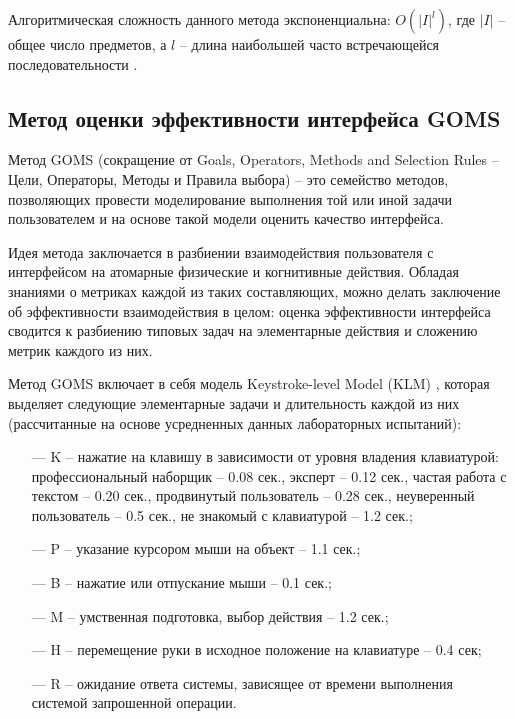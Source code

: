 
Алгоритмическая сложность данного метода экспоненциальна: $O(|I|^l)$, где $|I|$ -- общее число предметов, а $l$ -- длина наибольшей часто встречающейся последовательности \cite{Data_mining_book}.

\subsection{Метод оценки эффективности интерфейса GOMS}
Метод GOMS (сокращение от Goals, Operators, Methods and Selection Rules -- Цели, Операторы, Методы и Правила выбора) -- это семейство методов, позволяющих провести моделирование выполнения той или иной задачи пользователем и на основе такой модели оценить качество интерфейса.

Идея метода заключается в разбиении взаимодействия пользователя с интерфейсом на атомарные физические и когнитивные действия. Обладая знаниями о метриках каждой из таких составляющих, можно делать заключение об эффективности взаимодействия в целом: оценка
эффективности интерфейса сводится к разбиению типовых задач на элементарные действия и сложению метрик каждого из них.

Метод GOMS включает в себя модель Keystroke-level Model (KLM) \cite{11}, которая выделяет следующие элементарные задачи и длительность каждой из них (рассчитанные на основе усредненных данных лабораторных испытаний):

\begin{itemize}
	\item[---] K – нажатие на клавишу в зависимости от уровня владения клавиатурой: профессиональный	наборщик – 0.08 сек., эксперт – 0.12 сек., частая работа с текстом – 0.20 сек., продвинутый пользователь – 0.28 сек., неуверенный пользователь – 0.5 сек., не знакомый с клавиатурой – 1.2 сек.;
	\item[---] P – указание курсором мыши на объект – 1.1 сек.;
	\item[---] B – нажатие или отпускание мыши – 0.1 сек.;
	\item[---] M – умственная подготовка, выбор действия – 1.2 сек.;
	\item[---] H – перемещение руки в исходное положение на клавиатуре – 0.4 сек;
	\item[---] R – ожидание ответа системы, зависящее от	времени выполнения системой запрошенной операции.
\end{itemize}

